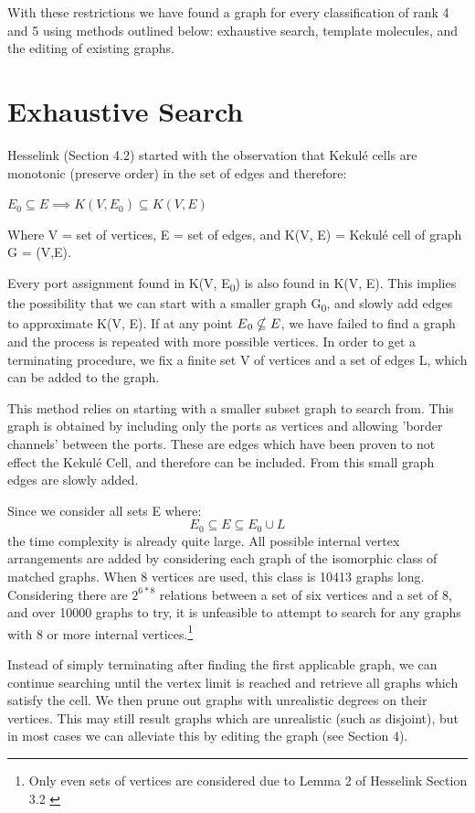 \documentclass[12pt]{article}
\begin{document}
With these restrictions we have found a graph for every classification of rank 4 and 5 using methods outlined below: exhaustive search, template molecules, and the editing of existing graphs. 

\section{Exhaustive Search}

Hesselink (Section 4.2) \cite{H13} started with the observation that Kekul\'e cells are monotonic (preserve order) in the set of edges and therefore: 

$E_0 \subseteq E \implies K(V, E_0) \subseteq K(V, E)$

Where V = set of vertices, E = set of edges, and K(V, E) = Kekul\'e cell of graph G = (V,E). 

Every port assignment found in K(V, E\textsubscript{0}) is also found in K(V, E). This implies the possibility that we can start with a smaller graph G\textsubscript{0}, and slowly add edges to approximate K(V, E). If at any point
$E\textsubscript0 \nsubseteq E$, we have failed to find a graph and
the process is repeated with more possible vertices. In order to get a terminating procedure, we fix a finite set V of vertices and a set of edges L, which can be added to the graph. 

This method relies on starting with a smaller subset graph to search from. This graph is obtained by including only the ports as vertices and allowing 'border channels' between the ports. These are edges which have been proven to not effect the Kekul\'e Cell, and therefore can be included. From this small graph edges are slowly added. 

Since we consider all sets E where: 
$$E_0 \subseteq E \subseteq E_0 \cup L$$
the time complexity is already quite large. All possible internal vertex arrangements are added by considering each graph of the isomorphic class of matched graphs. When 8 vertices are used, this class is 10413 graphs long. Considering there are $2^{6*8}$ relations between a set of six vertices and a set of 8, and over 10000 graphs to try, it is unfeasible to attempt to search for any graphs with 8 or more internal vertices.\footnote{Only even sets of vertices are considered due to Lemma 2 of Hesselink Section 3.2 \cite{H13}}

Instead of simply terminating after finding the first applicable graph, we can continue searching until the vertex limit is reached and retrieve all graphs which satisfy the cell. We then prune out graphs with unrealistic degrees on their vertices. This may still result graphs which are unrealistic (such as disjoint), but in most cases we can alleviate this by editing the graph (see Section 4).
\end{document}
